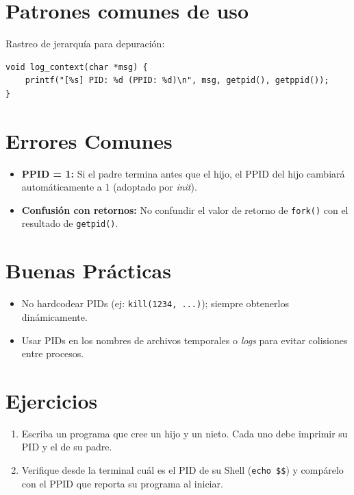 \documentclass[12pt,a4paper]{article}
\begin{document}
\section{Patrones comunes de uso}
Rastreo de jerarquía para depuración:
\begin{lstlisting}
void log_context(char *msg) {
    printf("[%s] PID: %d (PPID: %d)\n", msg, getpid(), getppid());
}
\end{lstlisting}

\section{Errores Comunes}
\begin{itemize}
    \item \textbf{PPID = 1:} Si el padre termina antes que el hijo, el PPID del hijo cambiará automáticamente a 1 (adoptado por \textit{init}).
    \item \textbf{Confusión con retornos:} No confundir el valor de retorno de \texttt{fork()} con el resultado de \texttt{getpid()}.
\end{itemize}

\section{Buenas Prácticas}
\begin{itemize}
    \item No hardcodear PIDs (ej: \texttt{kill(1234, ...)}); siempre obtenerlos dinámicamente.
    \item Usar PIDs en los nombres de archivos temporales o \textit{logs} para evitar colisiones entre procesos.
\end{itemize}

\section{Ejercicios}
\begin{enumerate}
    \item Escriba un programa que cree un hijo y un nieto. Cada uno debe imprimir su PID y el de su padre.
    \item Verifique desde la terminal cuál es el PID de su Shell (\texttt{echo \$\$}) y compárelo con el PPID que reporta su programa al iniciar.
\end{enumerate}
\end{document}
